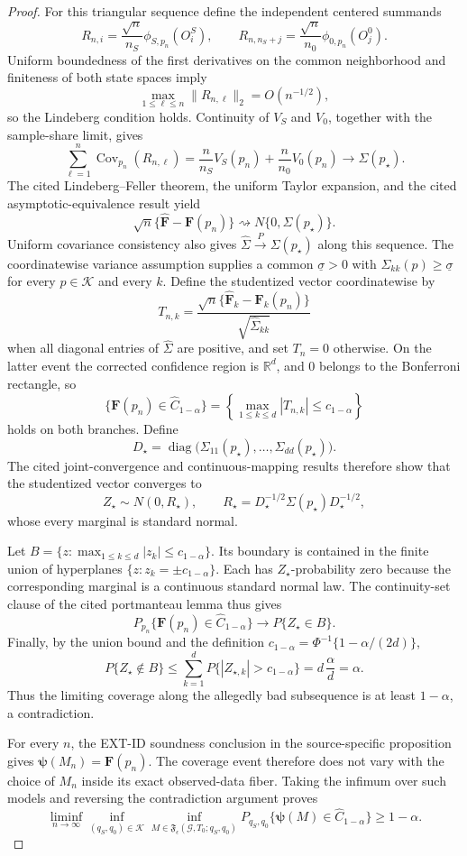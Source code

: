\documentclass{article}
\begin{document}
\begin{proof}
For this triangular sequence define the independent centered summands
\[
R_{n,i}=\frac{\sqrt n}{n_S}\phi_{S,p_n}(O_i^S),
\qquad
R_{n,n_S+j}=\frac{\sqrt n}{n_0}\phi_{0,p_n}(O_j^0).
\]
Uniform boundedness of the first derivatives on the common neighborhood and finiteness of both state spaces imply
\[
\max_{1\le \ell\le n}\|R_{n,\ell}\|_2=O(n^{-1/2}),
\]
so the Lindeberg condition holds.  Continuity of \(V_S\) and \(V_0\), together with the sample-share limit, gives
\[
\sum_{\ell=1}^{n}\operatorname{Cov}_{p_n}(R_{n,\ell})
=\frac n{n_S}V_S(p_n)+\frac n{n_0}V_0(p_n)
\longrightarrow\Sigma(p_\star).
\]
The cited Lindeberg--Feller theorem, the uniform Taylor expansion, and the cited asymptotic-equivalence result yield
\[
\sqrt n\{\widehat{\mathbf F}-\mathbf F(p_n)\}
\rightsquigarrow N\{0,\Sigma(p_\star)\}.
\]
Uniform covariance consistency also gives \(\widehat\Sigma\xrightarrow{P}\Sigma(p_\star)\) along this sequence.  The coordinatewise variance assumption supplies a common \(\underline\sigma>0\) with \(\Sigma_{kk}(p)\ge\underline\sigma\) for every \(p\in\mathcal K\) and every \(k\).  Define the studentized vector coordinatewise by
\[
T_{n,k}=\frac{\sqrt n\{\widehat{\mathbf F}_k-\mathbf F_k(p_n)\}}{\sqrt{\widehat\Sigma_{kk}}}
\]
when all diagonal entries of \(\widehat\Sigma\) are positive, and set \(T_n=0\) otherwise.  On the latter event the corrected confidence region is \(\mathbb R^d\), and \(0\) belongs to the Bonferroni rectangle, so
\[
\{\mathbf F(p_n)\in\widehat C_{1-\alpha}\}
=\left\{\max_{1\le k\le d}|T_{n,k}|\le c_{1-\alpha}\right\}
\]
holds on both branches.  Define
\[
D_\star=\operatorname{diag}\bigl(\Sigma_{11}(p_\star),\ldots,\Sigma_{dd}(p_\star)\bigr).
\]
The cited joint-convergence and continuous-mapping results therefore show that the studentized vector converges to
\[
Z_\star\sim N(0,R_\star),
\qquad
R_\star=D_\star^{-1/2}\Sigma(p_\star)D_\star^{-1/2},
\]
whose every marginal is standard normal.

Let \(B=\{z:\max_{1\le k\le d}|z_k|\le c_{1-\alpha}\}\).  Its boundary is contained in the finite union of hyperplanes \(\{z:z_k=\pm c_{1-\alpha}\}\).  Each has \(Z_\star\)-probability zero because the corresponding marginal is a continuous standard normal law.  The continuity-set clause of the cited portmanteau lemma thus gives
\[
P_{p_n}\{\mathbf F(p_n)\in\widehat C_{1-\alpha}\}
\longrightarrow P\{Z_\star\in B\}.
\]
Finally, by the union bound and the definition \(c_{1-\alpha}=\Phi^{-1}\{1-\alpha/(2d)\}\),
\[
P\{Z_\star\notin B\}
\le\sum_{k=1}^{d}P\{|Z_{\star,k}|>c_{1-\alpha}\}
=d\,\frac{\alpha}{d}=\alpha.
\]
Thus the limiting coverage along the allegedly bad subsequence is at least \(1-\alpha\), a contradiction.

For every \(n\), the EXT-ID soundness conclusion in the source-specific proposition gives \(\boldsymbol\psi(M_n)=\mathbf F(p_n)\).  The coverage event therefore does not vary with the choice of \(M_n\) inside its exact observed-data fiber.  Taking the infimum over such models and reversing the contradiction argument proves
\[
\liminf_{n\to\infty}\inf_{(q_S,q_0)\in\mathcal K}
\inf_{M\in\mathfrak F_{\epsilon}(\mathcal G,T_0;q_S,q_0)}
P_{q_S,q_0}\{\boldsymbol\psi(M)\in\widehat C_{1-\alpha}\}\ge1-\alpha.
\]
\end{proof}
\end{document}
